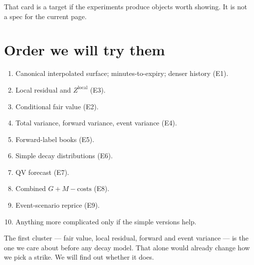 \documentclass[11pt]{article}
\begin{document}
That card is a target if the experiments produce objects worth
showing.  It is not a spec for the current page.


\section{Order we will try them}

\begin{enumerate}
    \item Canonical interpolated surface; minutes-to-expiry; denser
    history (E1).
    \item Local residual and \(Z^{\mathrm{local}}\) (E3).
    \item Conditional fair value (E2).
    \item Total variance, forward variance, event variance (E4).
    \item Forward-label books (E5).
    \item Simple decay distributions (E6).
    \item QV forecast (E7).
    \item Combined \(G+M-\mathrm{costs}\) (E8).
    \item Event-scenario reprice (E9).
    \item Anything more complicated only if the simple versions
    help.
\end{enumerate}

The first cluster --- fair value, local residual, forward and event
variance --- is the one we care about before any decay model.  That
alone would already change how we pick a strike.  We will find out
whether it does.
\end{document}

